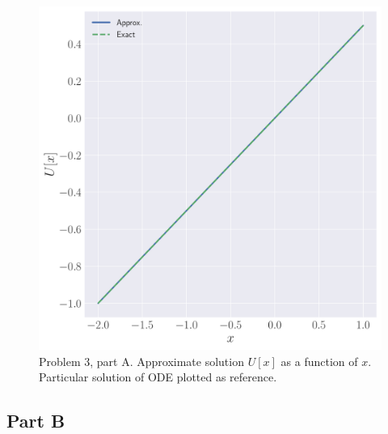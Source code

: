 \documentclass[12pt]{article}
\begin{document}
\begin{figure}[!h]
	\centering
	\includegraphics[clip, scale=0.30]{q3a_fig.pdf}
	\caption{Problem 3, part A. Approximate solution $U[x]$ as a function of $x$. Particular solution of ODE plotted as reference.}
\end{figure}

\FloatBarrier

\subsection*{Part B}
\end{document}

